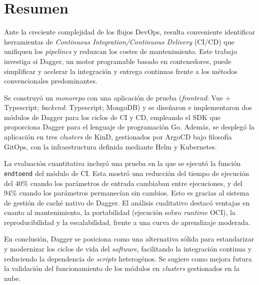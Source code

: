 \pagestyle{plain}
\chapter*{Resumen}

Ante la creciente complejidad de los flujos DevOps, resulta conveniente identificar herramientas de \textit{Continuous Integration/Continuous Delivery} (CI/CD) que unifiquen los \textit{pipelines} y reduzcan los costes de mantenimiento. Este trabajo investiga si Dagger, un motor programable basado en contenedores, puede simplificar y acelerar la integración y entrega continuas frente a los métodos convencionales predominantes.

Se construyó un \textit{monorepo} con una aplicación de prueba (\textit{frontend}: Vue + Typescript; \textit{backend}: Typescript; MongoDB) y se diseñaron e implementaron dos módulos de Dagger para los ciclos de CI y CD, empleando el SDK que proporciona Dagger para el lenguaje de programación Go. Además, se desplegó la aplicación en tres \textit{clusters} de KinD, gestionados por ArgoCD bajo filosofía GitOps, con la infraestructura definida mediante Helm y Kubernetes.

La evaluación cuantitativa incluyó una prueba en la que se ejecutó la función \texttt{endtoend} del módulo de CI. Esta mostró una reducción del tiempo de ejecución del 40\% cuando los parámetros de entrada cambiaban entre ejecuciones, y del 94\% cuando los parámetros permanecían sin cambios. Esto es gracias al sistema de gestión de caché nativo de Dagger. El análisis cualitativo destacó ventajas en cuanto al mantenimiento, la portabilidad (ejecución sobro \textit{runtime} OCI), la reproducibilidad y la escalabilidad, frente a una curva de aprendizaje moderada.

En conclusión, Dagger se posiciona como una alternativa sólida para estandarizar y modernizar los ciclos de vida del \textit{software}, facilitando la integración continua y reduciendo la dependencia de \textit{scripts} heterogénos. Se sugiere como mejora futura la validación del funcionamiento de los módulos en \textit{clusters} gestionados en la nube.
